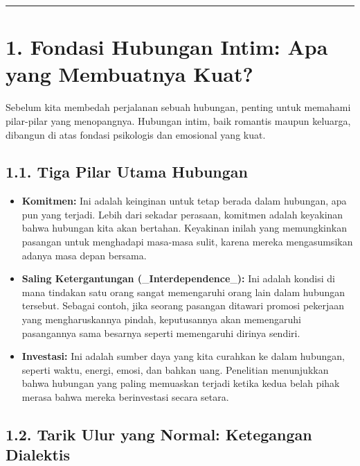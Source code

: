 \documentclass[
  letterpaper,
  DIV=11,
  numbers=noendperiod]{scrreprt}
\providecommand{\tightlist}{%
  \setlength{\itemsep}{0pt}\setlength{\parskip}{0pt}}
\begin{document}
\begin{center}\rule{0.5\linewidth}{0.5pt}\end{center}

\section{1. Fondasi Hubungan Intim: Apa yang Membuatnya
Kuat?}\label{fondasi-hubungan-intim-apa-yang-membuatnya-kuat}

Sebelum kita membedah perjalanan sebuah hubungan, penting untuk memahami
pilar-pilar yang menopangnya. Hubungan intim, baik romantis maupun
keluarga, dibangun di atas fondasi psikologis dan emosional yang kuat.

\subsection{1.1. Tiga Pilar Utama
Hubungan}\label{tiga-pilar-utama-hubungan}

\begin{itemize}
\tightlist
\item
  \textbf{Komitmen:} Ini adalah keinginan untuk tetap berada dalam
  hubungan, apa pun yang terjadi. Lebih dari sekadar perasaan, komitmen
  adalah keyakinan bahwa hubungan kita akan bertahan. Keyakinan inilah
  yang memungkinkan pasangan untuk menghadapi masa-masa sulit, karena
  mereka mengasumsikan adanya masa depan bersama.
\item
  \textbf{Saling Ketergantungan
  (}\_\textbf{Interdependence}\_\textbf{):} Ini adalah kondisi di mana
  tindakan satu orang sangat memengaruhi orang lain dalam hubungan
  tersebut. Sebagai contoh, jika seorang pasangan ditawari promosi
  pekerjaan yang mengharuskannya pindah, keputusannya akan memengaruhi
  pasangannya sama besarnya seperti memengaruhi dirinya sendiri.
\item
  \textbf{Investasi:} Ini adalah sumber daya yang kita curahkan ke dalam
  hubungan, seperti waktu, energi, emosi, dan bahkan uang. Penelitian
  menunjukkan bahwa hubungan yang paling memuaskan terjadi ketika kedua
  belah pihak merasa bahwa mereka berinvestasi secara setara.
\end{itemize}

\subsection{1.2. Tarik Ulur yang Normal: Ketegangan
Dialektis}\label{tarik-ulur-yang-normal-ketegangan-dialektis}
\end{document}
